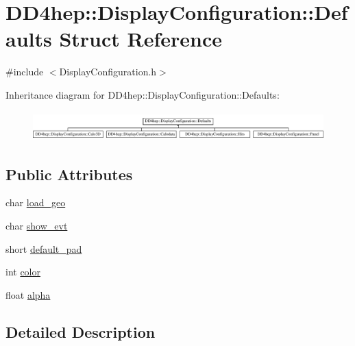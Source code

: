\hypertarget{struct_d_d4hep_1_1_display_configuration_1_1_defaults}{}\section{D\+D4hep\+:\+:Display\+Configuration\+:\+:Defaults Struct Reference}
\label{struct_d_d4hep_1_1_display_configuration_1_1_defaults}


{\ttfamily \#include $<$Display\+Configuration.\+h$>$}

Inheritance diagram for D\+D4hep\+:\+:Display\+Configuration\+:\+:Defaults\+:\begin{figure}[H]
\begin{center}
\leavevmode
\includegraphics[height=1.138211cm]{struct_d_d4hep_1_1_display_configuration_1_1_defaults}
\end{center}
\end{figure}
\subsection*{Public Attributes}
\begin{DoxyCompactItemize}
\item 
char \hyperlink{struct_d_d4hep_1_1_display_configuration_1_1_defaults_ad70e6ccfad33fb7a2282b01fb4118fc9}{load\+\_\+geo}
\item 
char \hyperlink{struct_d_d4hep_1_1_display_configuration_1_1_defaults_a63fc69fe802d80627939c1f00d188cde}{show\+\_\+evt}
\item 
short \hyperlink{struct_d_d4hep_1_1_display_configuration_1_1_defaults_a3c5fed67372178924ac8af2555704f4b}{default\+\_\+pad}
\item 
int \hyperlink{struct_d_d4hep_1_1_display_configuration_1_1_defaults_a0bf12d67de25954afafe95ab865c624b}{color}
\item 
float \hyperlink{struct_d_d4hep_1_1_display_configuration_1_1_defaults_ac0ef410d85c5a9695d6d6f595b6bd085}{alpha}
\end{DoxyCompactItemize}


\subsection{Detailed Description}


